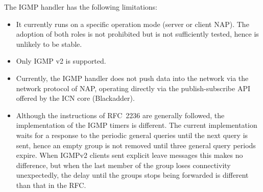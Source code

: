 \documentclass[a4paper,11pt,titlepage]{report}
\begin{document}
The IGMP handler has the following limitations:
\begin{itemize}
\item It currently runs on a specific operation mode (server or client NAP). The adoption of both roles is not prohibited but is not sufficiently tested, hence is unlikely to be stable.
\item Only IGMP v2 is supported.
\item Currently, the IGMP handler does not push data into the network via the network protocol of NAP,  operating directly via the publish-subscribe API offered by the ICN core (Blackadder).
\item Although the instructions of RFC~2236 are generally followed, the implementation of the IGMP timers is different. The current implementation waits for a response to the periodic general queries until the next query is sent, hence an empty group is not removed until three general query periods expire. When IGMPv2 clients sent explicit leave messages this makes no difference, but when the last member of the group loses connectivity unexpectedly, the delay until the groups stops being forwarded is different than that in the RFC. 
\end{itemize}




 
\end{document}
